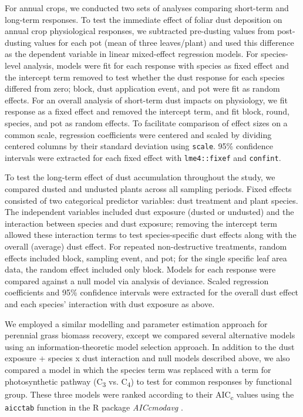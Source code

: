 \documentclass{svjour3}
\begin{document}
For annual crops, we conducted two sets of analyses comparing short-term and long-term responses. 
To test the immediate effect of foliar dust deposition on annual crop physiological responses, we subtracted pre-dusting values from post-dusting values for each pot (mean of three leaves/plant)  and used this difference as the dependent variable in linear mixed-effect regression models. 
For species-level analysis, models were fit for each response with species as fixed effect and the intercept term removed to test whether the dust response for each species differed from zero; block, dust application event, and pot were fit as random effects. 
For an overall analysis of short-term dust impacts on physiology, we fit response as a fixed effect and removed the intercept term, and fit block, round, species, and pot as random effects. 
To facilitate comparison of effect sizes on a common scale, regression coefficients were centered and scaled by dividing centered columns by their standard deviation using \texttt{scale}. 
95\% confidence intervals were extracted for each fixed effect with \texttt{lme4::fixef} and \texttt{confint}. 
 
To test the long-term effect of dust accumulation throughout the study, we compared dusted and undusted plants across all sampling periods. 
Fixed effects consisted of two categorical predictor variables: dust treatment and plant species. 
The independent variables included dust exposure (dusted or undusted) and the interaction between species and dust exposure; removing the intercept term allowed these interaction terms to test species-specific dust effects along with the overall (average) dust effect. 
For repeated non-destructive treatments, random effects included block, sampling event, and pot; for the single specific leaf area data, the random effect included only block.
Models for each response were compared against a null model via analysis of deviance. 
Scaled regression coefficients and 95\% confidence intervals were extracted for the overall dust effect and each species' interaction with dust exposure as above. 

We employed a similar modelling and parameter estimation approach for perennial grass biomass recovery, except we compared several alternative models using an information-theoretic model selection approach. 
In addition to the dust exposure + species x dust interaction and null models described above, we also compared a model in which the species term was replaced with a term for photosynthetic pathway (C\textsubscript{3} vs. C\textsubscript{4}) to test for common responses by functional group. 
These three models were ranked according to their AIC\textsubscript{c} values using the \texttt{aicctab} function in the \textsf{R} package \emph{AICcmodavg} \citep{mazerolle2016}. 
\end{document}
